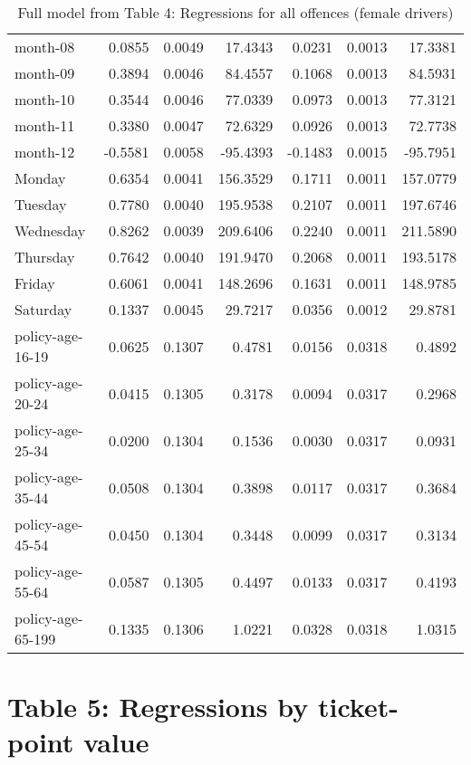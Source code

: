 \documentclass[10pt]{article}
\begin{document}
\begin{table}[ht]
\begin{tabular}{lrrrrrr}
  month-08 & 0.0855 & 0.0049 & 17.4343 & 0.0231 & 0.0013 & 17.3381 \\ 
  month-09 & 0.3894 & 0.0046 & 84.4557 & 0.1068 & 0.0013 & 84.5931 \\ 
  month-10 & 0.3544 & 0.0046 & 77.0339 & 0.0973 & 0.0013 & 77.3121 \\ 
  month-11 & 0.3380 & 0.0047 & 72.6329 & 0.0926 & 0.0013 & 72.7738 \\ 
  month-12 & -0.5581 & 0.0058 & -95.4393 & -0.1483 & 0.0015 & -95.7951 \\ 
  Monday & 0.6354 & 0.0041 & 156.3529 & 0.1711 & 0.0011 & 157.0779 \\ 
  Tuesday & 0.7780 & 0.0040 & 195.9538 & 0.2107 & 0.0011 & 197.6746 \\ 
  Wednesday & 0.8262 & 0.0039 & 209.6406 & 0.2240 & 0.0011 & 211.5890 \\ 
  Thursday & 0.7642 & 0.0040 & 191.9470 & 0.2068 & 0.0011 & 193.5178 \\ 
  Friday & 0.6061 & 0.0041 & 148.2696 & 0.1631 & 0.0011 & 148.9785 \\ 
  Saturday & 0.1337 & 0.0045 & 29.7217 & 0.0356 & 0.0012 & 29.8781 \\ 
  policy-age-16-19 & 0.0625 & 0.1307 & 0.4781 & 0.0156 & 0.0318 & 0.4892 \\ 
  policy-age-20-24 & 0.0415 & 0.1305 & 0.3178 & 0.0094 & 0.0317 & 0.2968 \\ 
  policy-age-25-34 & 0.0200 & 0.1304 & 0.1536 & 0.0030 & 0.0317 & 0.0931 \\ 
  policy-age-35-44 & 0.0508 & 0.1304 & 0.3898 & 0.0117 & 0.0317 & 0.3684 \\ 
  policy-age-45-54 & 0.0450 & 0.1304 & 0.3448 & 0.0099 & 0.0317 & 0.3134 \\ 
  policy-age-55-64 & 0.0587 & 0.1305 & 0.4497 & 0.0133 & 0.0317 & 0.4193 \\ 
  policy-age-65-199 & 0.1335 & 0.1306 & 1.0221 & 0.0328 & 0.0318 & 1.0315 \\ 
   \hline
\end{tabular}
\caption{Full model from Table 4: Regressions for all offences (female drivers)} 
\label{tab_4_all_pts_F}
\end{table}


\clearpage
\pagebreak




\section{Table 5: Regressions by ticket-point value}
\end{document}
